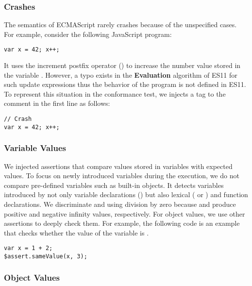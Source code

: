 \subsubsection{Crashes}

The semantics of ECMAScript rarely crashes because of the unspecified cases.
For example, consider the following JavaScript program:
\begin{lstlisting}[style=myJSstyle]
var x = 42; x++;
\end{lstlisting}
It uses the increment postfix operator (\code{++}) to increase the number value
stored in the variable .  However, a typo exists in the
\textbf{Evaluation} algorithm of ES11 for such update expressions thus the
behavior of the program is not defined in ES11.  To represent this situation in
the conformance test, we injects a tag  to the comment in the first
line as follows:
\begin{lstlisting}[style=myJSstyle]
// Crash
var x = 42; x++;
\end{lstlisting}


\subsubsection{Variable Values}

We injected assertions that compare values stored in variables with expected
values.  To focus on newly introduced variables during the execution, we do not
compare pre-defined variables such as built-in objects.  It detects variables
introduced by not only variable declarations () but also lexical
( or ) and function declarations.  We discriminate
 and  using division by zero because  and
 produce positive and negative infinity values, respectively.  For
object values, we use other assertions to deeply check them.  For example, the
following code is an example that checks whether the value of the variable
 is .
\begin{lstlisting}[style=myJSstyle]
var x = 1 + 2;
$assert.sameValue(x, 3);
\end{lstlisting}


\subsubsection{Object Values}

